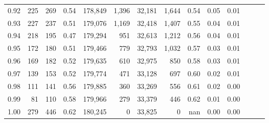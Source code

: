 \begin{tabular}{rrrrrrrrrrrrrr}
0.92 &    225 &  269 &  0.54 &  178,849 &    1,396 &  32,181 &   1,644 &  0.54 &  0.05 &      0.01 \\
0.93 &    227 &  237 &  0.51 &  179,076 &    1,169 &  32,418 &   1,407 &  0.55 &  0.04 &      0.01 \\
0.94 &    218 &  195 &  0.47 &  179,294 &      951 &  32,613 &   1,212 &  0.56 &  0.04 &      0.01 \\
0.95 &    172 &  180 &  0.51 &  179,466 &      779 &  32,793 &   1,032 &  0.57 &  0.03 &      0.01 \\
0.96 &    169 &  182 &  0.52 &  179,635 &      610 &  32,975 &     850 &  0.58 &  0.03 &      0.01 \\
0.97 &    139 &  153 &  0.52 &  179,774 &      471 &  33,128 &     697 &  0.60 &  0.02 &      0.01 \\
0.98 &    111 &  141 &  0.56 &  179,885 &      360 &  33,269 &     556 &  0.61 &  0.02 &      0.00 \\
0.99 &     81 &  110 &  0.58 &  179,966 &      279 &  33,379 &     446 &  0.62 &  0.01 &      0.00 \\
1.00 &    279 &  446 &  0.62 &  180,245 &        0 &  33,825 &       0 &   nan &  0.00 &      0.00 \\
\bottomrule
\end{tabular}
